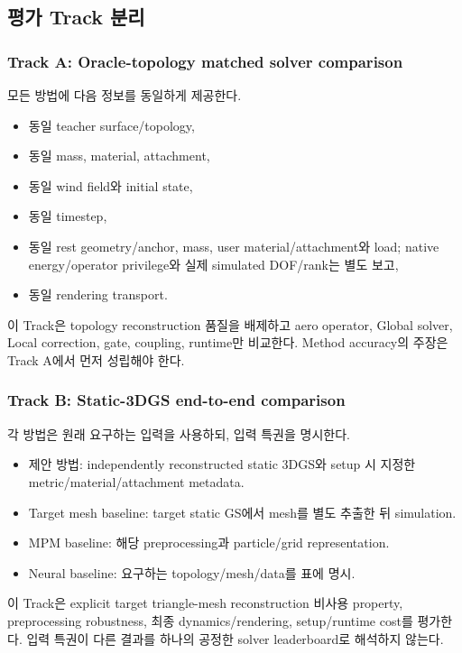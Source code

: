 \documentclass[11pt,a4paper]{article}
\begin{document}
\subsection{평가 Track 분리}

\subsubsection{Track A: Oracle-topology matched solver comparison}

모든 방법에 다음 정보를 동일하게 제공한다.

\begin{itemize}[leftmargin=1.5em]
  \item 동일 teacher surface/topology,
  \item 동일 mass, material, attachment,
  \item 동일 wind field와 initial state,
  \item 동일 timestep,
  \item 동일 rest geometry/anchor, mass, user material/attachment와 load;
  native energy/operator privilege와 실제 simulated DOF/rank는 별도 보고,
  \item 동일 rendering transport.
\end{itemize}

이 Track은 topology reconstruction 품질을 배제하고
aero operator, Global solver, Local correction, gate, coupling, runtime만 비교한다.
Method accuracy의 주장은 Track A에서 먼저 성립해야 한다.

\subsubsection{Track B: Static-3DGS end-to-end comparison}

각 방법은 원래 요구하는 입력을 사용하되, 입력 특권을 명시한다.

\begin{itemize}[leftmargin=1.5em]
  \item 제안 방법: independently reconstructed static 3DGS와 setup 시 지정한 metric/material/attachment metadata.
  \item Target mesh baseline: target static GS에서 mesh를 별도 추출한 뒤 simulation.
  \item MPM baseline: 해당 preprocessing과 particle/grid representation.
  \item Neural baseline: 요구하는 topology/mesh/data를 표에 명시.
\end{itemize}

이 Track은 explicit target triangle-mesh reconstruction 비사용 property, preprocessing robustness,
최종 dynamics/rendering, setup/runtime cost를 평가한다.
입력 특권이 다른 결과를 하나의 공정한 solver leaderboard로 해석하지 않는다.
\end{document}
